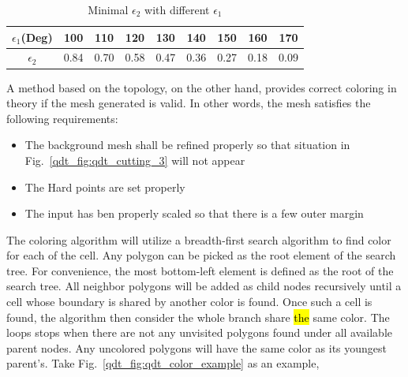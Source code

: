     \begin{table}[h!]
        \centering
        \caption{Minimal $\epsilon_2$ with different $\epsilon_1$}
        \label{qdt_tab:qdt_coloring_ep1_ep2}
        \begin{tabular}{ccccccccc}
            \toprule
            $\epsilon_1$(Deg) & 100    & 110      & 120     & 130      & 140     & 150   &   160  &  170   \\
            \midrule    
            $\epsilon_2$ & 0.84 & 0.70 & 0.58 & 0.47 & 0.36 & 0.27 &    0.18 &  0.09\\
            \bottomrule
        \end{tabular}
    \end{table}
A method based on the topology, on the other hand, provides correct coloring in theory if the mesh generated is valid.
In other words, the mesh satisfies the following requirements:
    \begin{itemize}
        \item The background mesh shall be refined properly so that situation in Fig.~\ref{qdt_fig:qdt_cutting_3} will not appear
        \item The Hard points are set properly
        \item The input has ben properly scaled so that there is a few outer margin
    \end{itemize}
The coloring algorithm will utilize a breadth-first search algorithm to find color for each of the cell.
Any polygon can be picked as the root element of the search tree.
For convenience, the most bottom-left element is defined as the root of the search tree.
All neighbor polygons will be added as child nodes recursively until a cell whose boundary is shared by another color is found.
Once such a cell is found, the algorithm then consider the whole branch share \hl{the} same color.
The loops stops when there are not any unvisited polygons found under all available parent nodes. 
Any uncolored polygons will have the same color as its youngest parent's.
Take Fig.~\ref{qdt_fig:qdt_color_example} as an example,
